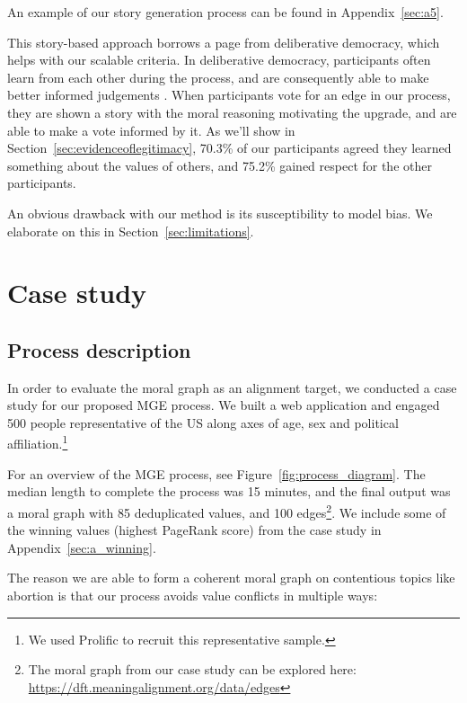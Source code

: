 \documentclass{article}
\theoremstyle{definition}
\begin{document}
An example of our story generation process can be found in Appendix~\ref{sec:a5}. 

This story-based approach borrows a page from deliberative democracy, which helps with our scalable criteria. In deliberative democracy, participants often learn from each other during the process, and are consequently able to make better informed judgements \citep{Bohman2006DeliberativeDA}. When participants vote for an edge in our process, they are shown a story with the moral reasoning motivating the upgrade, and are able to make a vote informed by it. As we'll show in Section~\ref{sec:evidenceoflegitimacy}, 70.3\% of our participants agreed they learned something about the values of others, and 75.2\% gained respect for the other participants.

An obvious drawback with our method is its susceptibility to model bias. We elaborate on this in Section~\ref{sec:limitations}.

\section{Case study}\label{sec:results}

\subsection{Process description}\label{sec:casestudy}

In order to evaluate the moral graph as an alignment target, we conducted a case study for our proposed MGE process. We built a web application and engaged 500 people representative of the US along axes of age, sex and political affiliation.\footnote{ We used Prolific to recruit this representative sample.}

For an overview of the MGE process, see Figure~\ref{fig:process_diagram}. The median length to complete the process was 15 minutes, and the final output was a moral graph with 85 deduplicated values, and 100 edges\footnote{The moral graph from our case study can be explored here: \href{https://dft.meaningalignment.org/data/edges}{https://dft.meaningalignment.org/data/edges}}. We include some of the winning values (highest PageRank score) from the case study in Appendix~\ref{sec:a_winning}.

The reason we are able to form a coherent moral graph on contentious topics like abortion is that our process avoids value conflicts in multiple ways:
\end{document}
